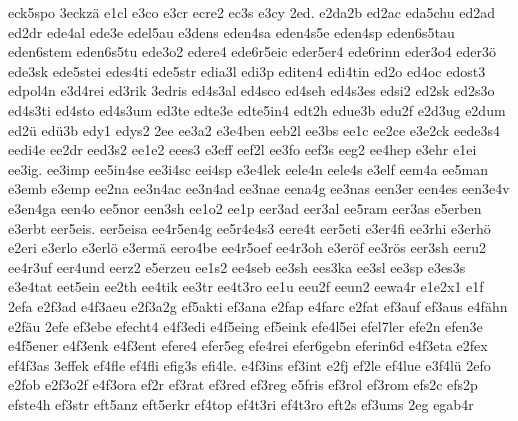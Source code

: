 {    eck5spo
    3eckzä
    e1cl
    e3co
    e3cr
    ecre2
    ec3s
    e3cy
    2ed.
    e2da2b
    ed2ac
    eda5chu
    ed2ad
    ed2dr
    ede4al
    ede3e
    edel5au
    e3dens
    eden4sa
    eden4s5e
    eden4sp
    eden6s5tau
    eden6stem
    eden6s5tu
    ede3o2
    edere4
    ede6r5eic
    eder5er4
    ede6rinn
    eder3o4
    eder3ö
    ede3sk
    ede5stei
    edes4ti
    ede5str
    edia3l
    edi3p
    editen4
    edi4tin
    ed2o
    ed4oc
    edost3
    edpol4n
    e3d4rei
    ed3rik
    3edris
    ed4s3al
    ed4sco
    ed4seh
    ed4s3es
    edsi2
    ed2sk
    ed2s3o
    ed4s3ti
    ed4sto
    ed4s3um
    ed3te
    edte3e
    edte5in4
    edt2h
    edue3b
    edu2f
    e2d3ug
    e2dum
    ed2ü
    edü3b
    edy1
    edys2
    2ee
    ee3a2
    e3e4ben
    eeb2l
    ee3bs
    ee1c
    ee2ce
    e3e2ck
    eede3s4
    eedi4e
    ee2dr
    eed3s2
    ee1e2
    eees3
    e3eff
    eef2l
    ee3fo
    eef3s
    eeg2
    ee4hep
    e3ehr
    e1ei
    ee3ig.
    ee3imp
    ee5in4se
    ee3i4sc
    eei4sp
    e3e4lek
    eele4n
    eele4s
    e3elf
    eem4a
    ee5man
    e3emb
    e3emp
    ee2na
    ee3n4ac
    ee3n4ad
    ee3nae
    eena4g
    ee3nas
    een3er
    een4es
    een3e4v
    e3en4ga
    een4o
    ee5nor
    een3sh
    ee1o2
    ee1p
    eer3ad
    eer3al
    ee5ram
    eer3as
    e5erben
    e3erbt
    eer5eis.
    eer5eisa
    ee4r5en4g
    ee5r4e4s3
    eere4t
    eer5eti
    e3er4fi
    ee3rhi
    e3erhö
    e2eri
    e3erlo
    e3erlö
    e3ermä
    eero4be
    ee4r5oef
    ee4r3oh
    e3eröf
    ee3rös
    eer3sh
    eeru2
    ee4r3uf
    eer4und
    eerz2
    e5erzeu
    ee1s2
    ee4seb
    ee3sh
    ees3ka
    ee3sl
    ee3sp
    e3es3s
    e3e4tat
    eet5ein
    ee2th
    ee4tik
    ee3tr
    ee4t3ro
    ee1u
    eeu2f
    eeun2
    eewa4r
    e1e2x1
    e1f
    2efa
    e2f3ad
    e4f3aeu
    e2f3a2g
    ef5akti
    ef3ana
    e2fap
    e4farc
    e2fat
    ef3auf
    ef3aus
    e4fähn
    e2fäu
    2efe
    ef3ebe
    efecht4
    e4f3edi
    e4f5eing
    ef5eink
    efe4l5ei
    efel7ler
    efe2n
    efen3e
    e4f5ener
    e4f3enk
    e4f3ent
    efere4
    efer5eg
    efe4rei
    efer6gebn
    eferin6d
    e4f3eta
    e2fex
    ef4f3as
    3effek
    ef4fle
    ef4fli
    efig3s
    efi4le.
    e4f3ins
    ef3int
    e2fj
    ef2le
    ef4lue
    e3f4lü
    2efo
    e2fob
    e2f3o2f
    e4f3ora
    ef2r
    ef3rat
    ef3red
    ef3reg
    e5fris
    ef3rol
    ef3rom
    efs2c
    efs2p
    efste4h
    ef3str
    eft5anz
    eft5erkr
    ef4top
    ef4t3ri
    ef4t3ro
    eft2s
    ef3ums
    2eg
    egab4r
}
